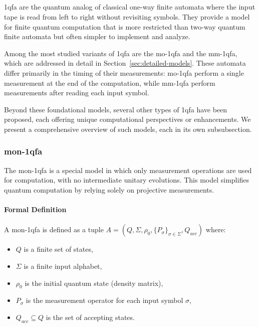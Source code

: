 \subsection{}
\label{sec:1-way-qfa}

\gls{1qfa} are the quantum analog of classical one-way finite automata where the input tape is read from left to right without revisiting symbols. They provide a model for finite quantum computation that is more restricted than two-way quantum finite automata but often simpler to implement and analyze.

Among the most studied variants of \gls{1qfa} are the \gls{mo-1qfa} and the \gls{mm-1qfa}, which are addressed in detail in Section~\ref{sec:detailed-models}. These automata differ primarily in the timing of their measurements: \gls{mo-1qfa} perform a single measurement at the end of the computation, while \gls{mm-1qfa} perform measurements after reading each input symbol.

Beyond these foundational models, several other types of \gls{1qfa} have been proposed, each offering unique computational perspectives or enhancements. We present a comprehensive overview of such models, each in its own subsubsection.

\subsubsection{\gls{mon-1qfa}}
The \gls{mon-1qfa} is a special model in which only measurement operations are used for computation, with no intermediate unitary evolutions. This model simplifies quantum computation by relying solely on projective measurements.

\paragraph{Formal Definition}
A \gls{mon-1qfa} is defined as a tuple \( A = (Q, \Sigma, \rho_0, \{P_{\sigma}\}_{\sigma \in \Sigma}, Q_{acc}) \) where:
\begin{itemize}
    \item \( Q \) is a finite set of states,
    \item \( \Sigma \) is a finite input alphabet,
    \item \( \rho_0 \) is the initial quantum state (density matrix),
    \item \( P_{\sigma} \) is the measurement operator for each input symbol \( \sigma \),
    \item \( Q_{acc} \subseteq Q \) is the set of accepting states.
\end{itemize}

